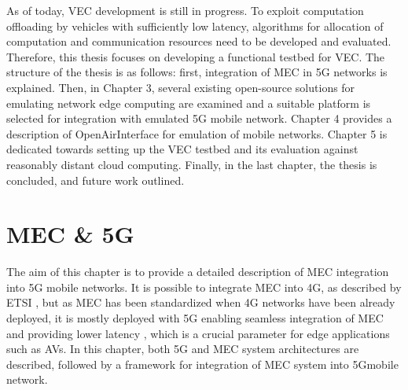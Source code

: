 \documentclass[12pt,a4paper,twoside]{report}
\begin{document}
As of today, VEC development is still in progress. To exploit computation offloading by vehicles with sufficiently low latency, algorithms for allocation of computation and communication resources need to be developed and evaluated. Therefore, this thesis focuses on developing a functional testbed for VEC. The structure of the thesis is as follows: first, integration of MEC in 5G networks is explained. Then, in Chapter 3, several existing open-source solutions for emulating network edge computing are examined and a suitable platform is selected for integration with emulated 5G mobile network. Chapter 4 provides a description of OpenAirInterface for emulation of mobile networks. Chapter 5 is dedicated towards setting up the VEC testbed and its evaluation against reasonably distant cloud computing. Finally, in the last chapter, the thesis is concluded, and future work outlined.
\chapter{MEC \& 5G}
The aim of this chapter is to provide a detailed description of MEC integration into 5G mobile networks. It is possible to integrate MEC into 4G, as described by ETSI \cite{ETSI:wp24}, but as MEC has been standardized when 4G networks have been already deployed, it is mostly deployed with 5G enabling seamless integration of MEC \cite{ETSI:wp28} and providing lower latency \cite{dahlman-2020-5g}, which is a crucial parameter for edge applications such as AVs.  In this chapter, both 5G and MEC system architectures are described, followed by a framework for integration of MEC system into 5Gmobile network.
\end{document}
